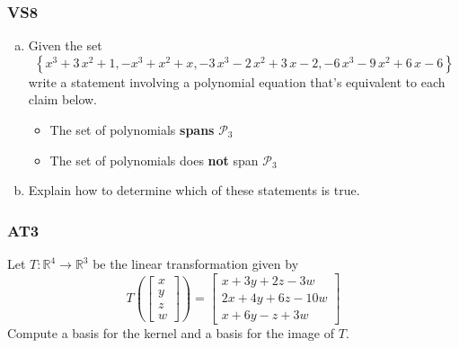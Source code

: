 \documentclass[aspectratio=1610]{beamer}
\newcommand{\IR}{\mathbb{R}}
\begin{document}
\begin{frame}\frametitle{VS8}

\begin{enumerate}[(a)]
\item  

 Given the set \[\left\{ x^{3} + 3 \, x^{2} + 1 , -x^{3} + x^{2} + x , -3 \, x^{3} - 2 \, x^{2} + 3 \, x - 2 , -6 \, x^{3} - 9 \, x^{2} + 6 \, x - 6 \right\}\] write a statement involving a polynomial equation that's equivalent to each claim below. 

 

\begin{itemize}
\item  

 The set of polynomials \textbf{spans} \(\mathcal{P}_3\) 

 
\item  

 The set of polynomials does \textbf{not} span \(\mathcal{P}_3\) 

 
\end{itemize}

     
\item  

 Explain how to determine which of these statements is true. 

 
\end{enumerate}
\end{frame}



\begin{frame}\frametitle{AT3}
Let \(T: \IR^4 \rightarrow \IR^3\) be the linear transformation given by
\[
  T\left(\begin{bmatrix}x\\y\\z\\w\end{bmatrix} \right) =
  \begin{bmatrix}
    x+3y+2z-3w \\
    2x+4y+6z-10w \\
    x+6y-z+3w
  \end{bmatrix}
\]
Compute a basis for the kernel and a basis for the image of \(T\).
\end{frame}
\end{document}
